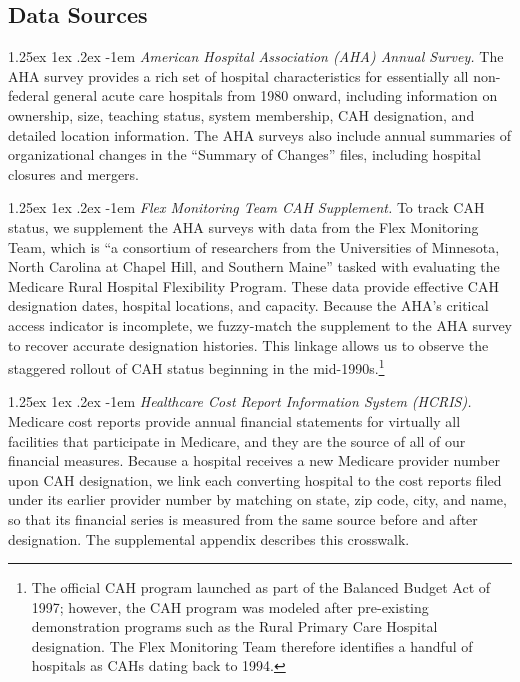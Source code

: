 \documentclass[a4paper, 12pt, twoside]{article}
\makeatletter
\renewcommand\paragraph{\@startsection{paragraph}{4}{\z@}%
   {1.25ex \@plus 1ex \@minus .2ex}%
   {-1em}%
   {\normalfont\itshape}}
\makeatother
\begin{document}
\subsection{Data Sources}

\paragraph{\textit{American Hospital Association (AHA) Annual Survey.}}  
The AHA survey provides a rich set of hospital characteristics for essentially all non-federal general acute care hospitals from 1980 onward, including information on ownership, size, teaching status, system membership, CAH designation, and detailed location information. The AHA surveys also include annual summaries of organizational changes in the ``Summary of Changes'' files, including hospital closures and mergers.

\paragraph{\textit{Flex Monitoring Team CAH Supplement.}}  
To track CAH status, we supplement the AHA surveys with data from the Flex Monitoring Team, which is ``a consortium of researchers from the Universities of Minnesota, North Carolina at Chapel Hill, and Southern Maine'' tasked with evaluating the Medicare Rural Hospital Flexibility Program. These data provide effective CAH designation dates, hospital locations, and capacity. Because the AHA’s critical access indicator is incomplete, we fuzzy-match the supplement to the AHA survey to recover accurate designation histories. This linkage allows us to observe the staggered rollout of CAH status beginning in the mid-1990s.\footnote{The official CAH program launched as part of the Balanced Budget Act of 1997; however, the CAH program was modeled after pre-existing demonstration programs such as the Rural Primary Care Hospital designation. The Flex Monitoring Team therefore identifies a handful of hospitals as CAHs dating back to 1994.}

\paragraph{\textit{Healthcare Cost Report Information System (HCRIS).}}  
Medicare cost reports provide annual financial statements for virtually all facilities that participate in Medicare, and they are the source of all of our financial measures. Because a hospital receives a new Medicare provider number upon CAH designation, we link each converting hospital to the cost reports filed under its earlier provider number by matching on state, zip code, city, and name, so that its financial series is measured from the same source before and after designation. The supplemental appendix describes this crosswalk.
\end{document}
